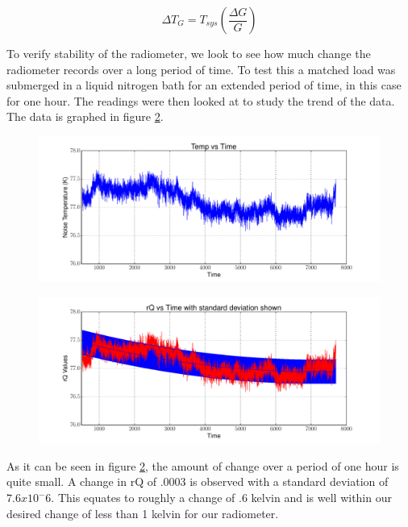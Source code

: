 \begin{equation} \label{eq:rad_stability}
\Delta T_G=T_{sys} \left(\frac{\Delta G}{G}\right)
\end{equation}

To verify stability of the radiometer, we look to see how much change the radiometer records over a long period of time.  To test this a matched load was submerged in a liquid nitrogen bath for an extended period of time, in this case for one hour.  The readings were then looked at to study the trend of the data.  The data is graphed in figure \ref{Stability}.

\begin{figure}[h!tb] \centering
\includegraphics[width=\textwidth]{Experiments/Exp2/sdr_calibrated_zoom.pdf}
\label{Stability}
\end{figure}

\begin{figure}[h!tb] \centering
\includegraphics[width=\textwidth]{Experiments/Exp2/calib_vstime_stddev.pdf}
\label{Stability}
\end{figure}

As it can be seen in figure \ref{Stability}, the amount of change over a period of one hour is quite small.  A change in rQ of .0003 is observed with a standard deviation of $7.6 x 10^-6$.  This equates to roughly a change of .6 kelvin and is well within our desired change of less than 1 kelvin for our radiometer.

